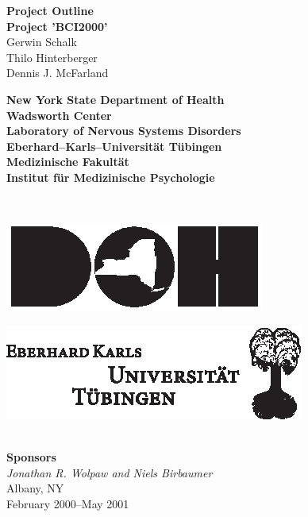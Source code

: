 \begin{titlepage}
\hspace{-7mm}%
\begin{minipage}{\textwidth}
\begin{center}
\vspace{.5cm}
{\large \bf Project Outline\\[3ex]}
{\huge \bf Project 'BCI2000'}
\\[1.5cm]
{\Large Gerwin Schalk\\}
{\Large Thilo Hinterberger\\}
{\Large Dennis J. McFarland\\[1.5cm]}
%
\begin{minipage}{13cm}
  \begin{minipage}[c]{13cm}
    \begin{center}
      {\Large \bf New York State Department of Health\\[2ex]}
      {\large \bf Wadsworth Center\\[0.5ex]
       Laboratory of Nervous Systems Disorders\\[4ex]}
      {\Large \bf Eberhard--Karls--Universit\"at T\"ubingen\\[2ex]}
      {\large \bf Medizinische Fakult\"at\\[0.5ex]
       Institut f\"ur Medizinische Psychologie\\[0.5ex]}
    \end{center}
  \end{minipage}
  \\[1.0cm]
  \begin{minipage}[c]{6cm}
    \centerline{\includegraphics{figures/DOHlogo.eps}}
  \end{minipage}
  \hspace{1.5cm}
  \begin{minipage}[c]{3cm}
    \centerline{\includegraphics{figures/EKUlogo.eps}}
  \end{minipage}
\end{minipage}
%
\\[2.0cm]
\textbf{Sponsors} \\
\textit{Jonathan R. Wolpaw and Niels Birbaumer}
\\[1.5cm]
{Albany, NY} \\[1ex]
{February 2000--May 2001}
\end{center}
\end{minipage}
\end{titlepage}
